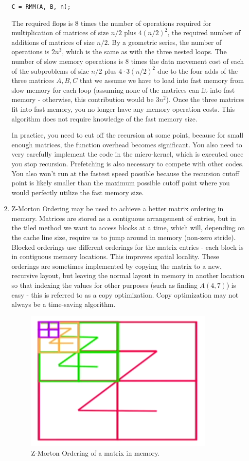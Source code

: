 \documentclass[10pt]{article}
\begin{document}
\begin{flushleft}
\begin{enumerate}
\begin{lstlisting}[basicstyle=\ttfamily\small]
C = RMM(A, B, n);
\end{lstlisting}

The required flops is 8 times the number of operations required for multiplication of matrices of size \(n/2\) plus \(4(n/2)^2\), the required number of additions of matrices of size \(n/2\). By a geometric series, the number of operations is \(2n^3\), which is the same as with the three nested loops. The number of slow memory operations is 8 times the data movement cost of each of the subproblems of size \(n/2\) plus \(4\cdot3(n/2)^2\) due to the four adds of the three matrices \(A, B, C\) that we assume we have to load into fast memory from slow memory for each loop (assuming none of the matrices can fit into fast memory - otherwise, this contribution would be \(3n^2\)). Once the three matrices fit into fast memory, you no longer have any memory operation costs. This algorithm does not require knowledge of the fast memory size.

In practice, you need to cut off the recursion at some point, because for small enough matrices, the function overhead becomes significant. You also need to very carefully implement the code in the micro-kernel, which is executed once you stop recursion. Prefetching is also necessary to compete with other codes. You also won't run at the fastest speed possible because the recursion cutoff point is likely smaller than the maximum possible cutoff point where you would perfectly utilize the fast memory size.

\item Z-Morton Ordering may be used to achieve a better matrix ordering in memory. Matrices are stored as a contiguous arrangement of entries, but in the tiled method we want to access blocks at a time, which will, depending on the cache line size, require us to jump around in memory (non-zero stride). Blocked orderings use different orderings for the matrix entries - each block is in contiguous memory locations. This improves spatial locality. These orderings are sometimes implemented by copying the matrix to a new, recursive layout, but leaving the normal layout in memory in another location so that indexing the values for other purposes (such as finding \(A(4,7)\)) is easy - this is referred to as a copy optimization. Copy optimization may not always be a time-saving algorithm.

\begin{figure}[H]
\centering
\includegraphics[width=0.25\linewidth]{figures/Z-morton-ordering.pdf}
\caption{Z-Morton Ordering of a matrix in memory.}
\end{figure}


\end{enumerate}
\end{flushleft}
\end{document}
